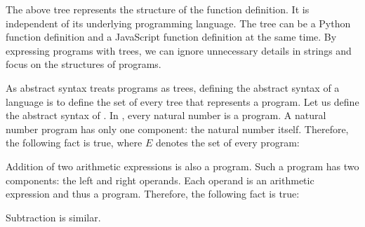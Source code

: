 The above tree represents the structure of the function definition. It is
independent of its underlying programming language. The tree can be a Python
function definition and a JavaScript function definition at the same time. By
expressing programs with trees, we can ignore unnecessary details in strings and
focus on the structures of programs.

As abstract syntax treats programs as trees, defining the abstract syntax of a
language is to define the set of every tree that represents a program. Let us
define the abstract syntax of \Lang. In \Lang, every natural number is a
program. A natural number program has only one component: the natural number
itself. Therefore, the following fact is true, where $E$ denotes the set of
every program:

\begin{center}
\end{center}

Addition of two arithmetic expressions is also a program. Such a program has
two components: the left and right operands. Each operand is an arithmetic
expression and thus a program. Therefore, the following fact is true:

\begin{center}
\end{center}

Subtraction is similar.

\begin{center}
\end{center}

